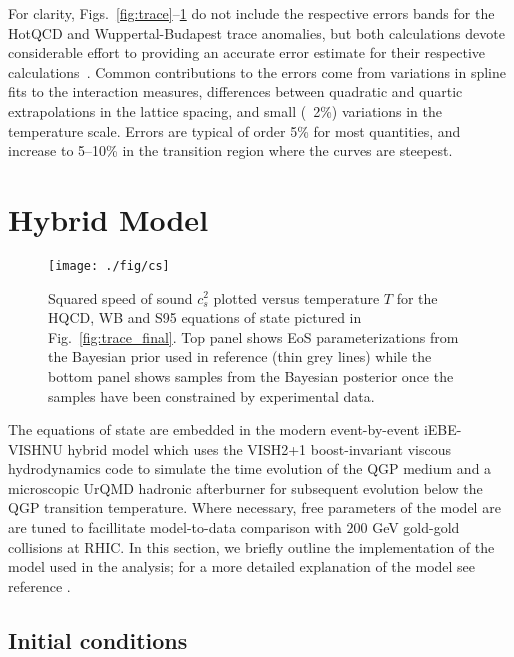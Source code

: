 \documentclass[aps,prc,reprint,amsmath,nofootinbib,superscriptaddress]{revtex4-1}
\begin{document}
For clarity, Figs.~\ref{fig:trace}--\ref{fig:cs} do not include the respective errors bands for the HotQCD and Wuppertal-Budapest trace anomalies, but both calculations devote considerable effort
to providing an accurate error estimate for their respective calculations~\cite{Borsanyi:2013bia,Bazavov:2014pvz}.  Common contributions to the errors
come from variations in spline fits to the interaction measures, differences between quadratic and quartic extrapolations in the lattice spacing, and
small (~2\%) variations in the temperature scale.  Errors are typical of order 5\% for most quantities, and increase to 5--10\% in the transition region
where the curves are steepest.


\section{Hybrid Model}

\begin{figure}[b]
  \texttt{[image: ./fig/cs]}
  \caption{\label{fig:cs} Squared speed of sound $c_s^2$ plotted versus temperature $T$ for the HQCD, WB and S95 equations of state pictured in 
           Fig.~\ref{fig:trace_final}. Top panel shows EoS parameterizations from the Bayesian prior used in reference \cite{Pratt:2015zsa} (thin grey lines)
           while the bottom panel shows samples from the Bayesian posterior once the samples have been constrained by experimental data.
          }
\end{figure}

The equations of state are embedded in the modern event-by-event iEBE-VISHNU hybrid model which uses the VISH2+1 boost-invariant viscous hydrodynamics code to simulate the 
time evolution of the QGP medium and a microscopic UrQMD hadronic afterburner for subsequent evolution below the QGP transition temperature. Where necessary, free
parameters of the model are are tuned to facillitate model-to-data comparison with $200$ GeV gold-gold collisions at RHIC. In this section, we briefly outline
the implementation of the model used in the analysis; for a more detailed explanation of the model see reference \cite{Shen:2014vra}. 





\subsection{Initial conditions}
\label{initial_condition}
\end{document}

